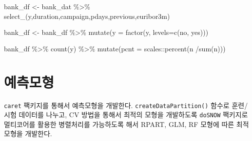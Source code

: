 \documentclass[
  letterpaper,
  chapter,a4paper,showtrims,openright,hidelinks]{oblivoir}
\newenvironment{Shaded}{\begin{snugshade}}{\end{snugshade}}
\newcommand{\AttributeTok}[1]{\textcolor[rgb]{0.40,0.45,0.13}{#1}}
\newcommand{\FunctionTok}[1]{\textcolor[rgb]{0.28,0.35,0.67}{#1}}
\newcommand{\NormalTok}[1]{\textcolor[rgb]{0.00,0.23,0.31}{#1}}
\newcommand{\OtherTok}[1]{\textcolor[rgb]{0.00,0.23,0.31}{#1}}
\newcommand{\SpecialCharTok}[1]{\textcolor[rgb]{0.37,0.37,0.37}{#1}}
\newcommand{\StringTok}[1]{\textcolor[rgb]{0.13,0.47,0.30}{#1}}
\begin{document}
\begin{Shaded}
\begin{Highlighting}[]
\NormalTok{bank\_df }\OtherTok{\textless{}{-}}\NormalTok{ bank\_dat }\SpecialCharTok{\%\textgreater{}\%} 
    \FunctionTok{select\_}\NormalTok{(}\StringTok{\textquotesingle{}y\textquotesingle{}}\NormalTok{,}\StringTok{\textquotesingle{}duration\textquotesingle{}}\NormalTok{,}\StringTok{\textquotesingle{}campaign\textquotesingle{}}\NormalTok{,}\StringTok{\textquotesingle{}pdays\textquotesingle{}}\NormalTok{,}\StringTok{\textquotesingle{}previous\textquotesingle{}}\NormalTok{,}\StringTok{\textquotesingle{}euribor3m\textquotesingle{}}\NormalTok{)}


\NormalTok{bank\_df }\OtherTok{\textless{}{-}}\NormalTok{ bank\_df }\SpecialCharTok{\%\textgreater{}\%} 
    \FunctionTok{mutate}\NormalTok{(}\AttributeTok{y =} \FunctionTok{factor}\NormalTok{(y, }\AttributeTok{levels=}\FunctionTok{c}\NormalTok{(}\StringTok{\textquotesingle{}no\textquotesingle{}}\NormalTok{, }\StringTok{\textquotesingle{}yes\textquotesingle{}}\NormalTok{)))}

\NormalTok{bank\_df }\SpecialCharTok{\%\textgreater{}\%} 
    \FunctionTok{count}\NormalTok{(y) }\SpecialCharTok{\%\textgreater{}\%} 
    \FunctionTok{mutate}\NormalTok{(}\AttributeTok{pcnt =}\NormalTok{ scales}\SpecialCharTok{::}\FunctionTok{percent}\NormalTok{(n }\SpecialCharTok{/}\FunctionTok{sum}\NormalTok{(n)))}
\end{Highlighting}
\end{Shaded}

\hypertarget{predictive-model-caret}{%
\section{예측모형}\label{predictive-model-caret}}

\texttt{caret} 팩키지를 통해서 예측모형을 개발한다.
\texttt{createDataPartition()} 함수로 훈련/시험 데이터를 나누고, CV
방법을 통해서 최적의 모형을 개발하도록 \texttt{doSNOW} 팩키지로
멀티코어를 활용한 병렬처리를 가능하도록 해서 RPART, GLM, RF 모형에 따른
최적 모형을 개발한다.
\end{document}
